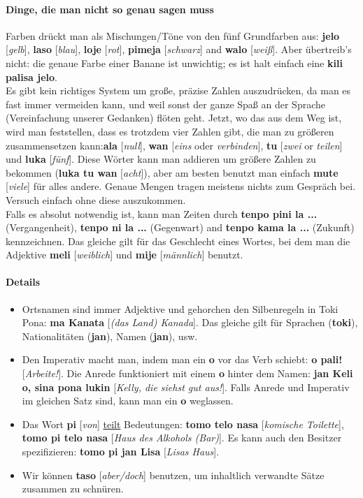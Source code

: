\documentclass[10pt,a4paper]{article}
\begin{document}
\paragraph{Dinge, die man nicht so genau sagen muss}
Farben drückt man als Mischungen/Töne von den fünf Grundfarben aus: \textbf{jelo} [\textit{gelb}], \textbf{laso} [\textit{blau}], \textbf{loje} [\textit{rot}], \textbf{pimeja} [\textit{schwarz}] and \textbf{walo} [\textit{weiß}]. Aber übertreib's nicht: die genaue Farbe einer Banane ist unwichtig; es ist halt einfach eine \textbf{kili palisa jelo}.\\
\noindent Es gibt kein richtiges System um große, präzise Zahlen auszudrücken, da man es fast immer vermeiden kann, und weil sonst der ganze Spaß an der Sprache (Vereinfachung unserer Gedanken) flöten geht. Jetzt, wo das aus dem Weg ist, wird man feststellen, dass es trotzdem vier Zahlen gibt, die man zu größeren zusammensetzen kann:\textbf{ala} [\textit{null}], \textbf{wan} [\textit{eins} oder \textit{verbinden}], \textbf{tu} [\textit{zwei} or \textit{teilen}] und \textbf{luka} [\textit{fünf}]. Diese Wörter kann man addieren um größere Zahlen zu bekommen (\textbf{luka tu wan} [\textit{acht}]), aber am besten benutzt man einfach \textbf{mute} [\textit{viele}] für alles andere. Genaue Mengen tragen meistens nichts zum Gespräch bei. Versuch einfach ohne diese auszukommen.\\
Falls es absolut notwendig ist, kann man Zeiten durch \textbf{tenpo pini la ...} (Vergangenheit), \textbf{tenpo ni la ...} (Gegenwart) and \textbf{tenpo kama la ...} (Zukunft) kennzeichnen. Das gleiche gilt für das Geschlecht eines Wortes, bei dem man die Adjektive \textbf{meli} [\textit{weiblich}] und \textbf{mije} [\textit{männlich}] benutzt.

\paragraph{Details}
\begin{multicols}{2}
\begin{itemize}
\item Ortsnamen sind immer Adjektive und gehorchen den Silbenregeln in Toki Pona: \textbf{ma Kanata} [\textit{(das Land) Kanada}]. Das gleiche gilt für Sprachen (\textbf{toki}), Nationalitäten (\textbf{jan}), Namen (\textbf{jan}), usw.
\item Den Imperativ macht man, indem man ein \textbf{o} vor das Verb schiebt: \textbf{o pali!} [\textit{Arbeite!}]. Die Anrede funktioniert mit einem \textbf{o} hinter dem Namen: \textbf{jan Keli o, sina pona lukin} [\textit{Kelly, die siehst gut aus!}]. Falls Anrede und Imperativ im gleichen Satz sind, kann man ein \textbf{o} weglassen.
\item Das Wort \textbf{pi} [\textit{von}] \underline{teilt} Bedeutungen: \textbf{tomo telo nasa} [\textit{komische Toilette}], \textbf{tomo pi telo nasa} [\textit{Haus des Alkohols (Bar)}]. Es kann auch den Besitzer spezifizieren: \textbf{tomo pi jan Lisa} [\textit{Lisas Haus}].
\item Wir können \textbf{taso} [\textit{aber/doch}] benutzen, um inhaltlich verwandte Sätze zusammen zu schnüren.
\end{itemize}
\end{multicols}
\end{document}
